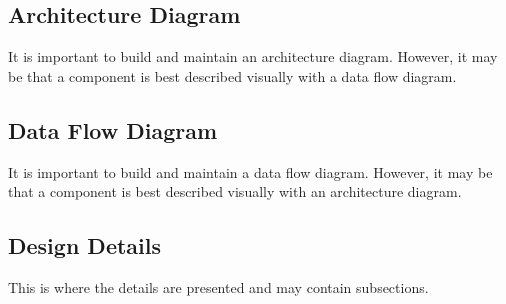 \subsection{ Architecture  Diagram}
It is important to build and maintain an architecture diagram.  However, it may 
be that a component is best described visually with a data flow diagram. 


\subsection{Data Flow Diagram}
It is important to build and maintain a data flow diagram.  However, it may be 
that a component is best described visually with an architecture diagram. 


\subsection{Design Details}
This is where the details are presented and may contain subsections. 



